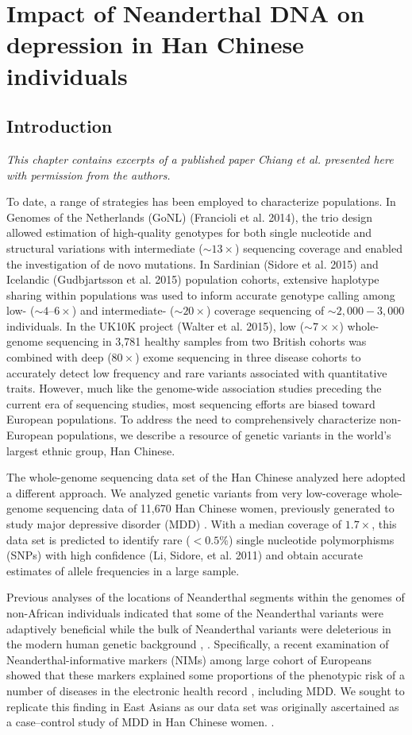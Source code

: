 \chapter{Impact of Neanderthal DNA on depression in Han Chinese individuals}
\section{Introduction} 
\textit{This chapter contains excerpts of a published paper Chiang et al. \cite{chiang2018comprehensive} presented here with permission from the authors.
}

To date, a range of strategies has been employed to characterize populations. In Genomes of the Netherlands (GoNL) (Francioli et al. 2014), the trio design allowed estimation of high-quality genotypes for both single nucleotide and structural variations with intermediate ($\sim13\times$) sequencing coverage and enabled the investigation of de novo mutations. In Sardinian (Sidore et al. 2015) and Icelandic (Gudbjartsson et al. 2015) population cohorts, extensive haplotype sharing within populations was used to inform accurate genotype calling among low- ($\sim4 – 6\times$) and intermediate- ($\sim20\times$) coverage sequencing of $\sim2,000 - 3,000$ individuals. In the UK10K project (Walter et al. 2015), low ($\sim7×\times$) whole-genome sequencing in 3,781 healthy samples from two British cohorts was combined with deep ($80\times$) exome sequencing in three disease cohorts to accurately detect low frequency and rare variants associated with quantitative traits. However, much like the genome-wide association studies preceding the current era of sequencing studies, most sequencing efforts are biased toward European populations. To address the need to comprehensively characterize non-European populations, we describe a resource of genetic variants in the world’s largest ethnic group, Han Chinese.

The whole-genome sequencing data set of the Han Chinese analyzed here adopted a different approach. We analyzed genetic variants from very low-coverage whole-genome sequencing data of 11,670 Han Chinese women, previously generated to study major depressive disorder (MDD) \cite{cai2015sparse}. With a median coverage of $1.7\times$, this data set is predicted to identify rare ($<0.5\%$) single nucleotide polymorphisms (SNPs) with high confidence (Li, Sidore, et al. 2011) and obtain accurate estimates of allele frequencies in a large sample. 

Previous analyses of the locations of Neanderthal segments within the genomes of non-African individuals indicated that some of the Neanderthal variants were adaptively beneficial while the bulk of Neanderthal variants were deleterious in the modern human genetic background \cite{harris2016genetic}, \cite{juric2016strength}. Specifically, a recent examination of Neanderthal-informative markers (NIMs) among large cohort of Europeans showed that these markers explained some proportions of the phenotypic risk of a number of diseases in the electronic health record \cite{simonti2016phenotypic}, including MDD. We sought to replicate this finding in East Asians as our data set was originally ascertained as a case–control study of MDD in Han Chinese women. \cite{cai2015sparse}.
